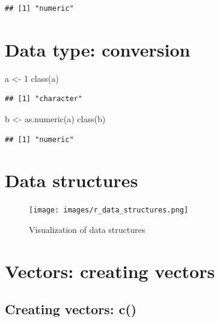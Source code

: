 \documentclass[
  11pt,
]{book}
\newenvironment{Shaded}{\begin{snugshade}}{\end{snugshade}}
\newcommand{\FunctionTok}[1]{\textcolor[rgb]{0.00,0.00,0.00}{#1}}
\newcommand{\NormalTok}[1]{#1}
\newcommand{\OtherTok}[1]{\textcolor[rgb]{0.56,0.35,0.01}{#1}}
\newcommand{\StringTok}[1]{\textcolor[rgb]{0.31,0.60,0.02}{#1}}
\begin{document}
\begin{verbatim}
## [1] "numeric"
\end{verbatim}

\hypertarget{data-type-conversion}{%
\section{Data type: conversion}\label{data-type-conversion}}

\begin{Shaded}
\begin{Highlighting}[]
\NormalTok{a }\OtherTok{\textless{}{-}} \StringTok{\textquotesingle{}1\textquotesingle{}}
\FunctionTok{class}\NormalTok{(a)}
\end{Highlighting}
\end{Shaded}

\begin{verbatim}
## [1] "character"
\end{verbatim}

\begin{Shaded}
\begin{Highlighting}[]
\NormalTok{b }\OtherTok{\textless{}{-}} \FunctionTok{as.numeric}\NormalTok{(a)}
\FunctionTok{class}\NormalTok{(b)}
\end{Highlighting}
\end{Shaded}

\begin{verbatim}
## [1] "numeric"
\end{verbatim}

\hypertarget{data-structures}{%
\section{Data structures}\label{data-structures}}

\begin{figure}
\centering
\texttt{[image: images/r\_data\_structures.png]}
\caption{Visualization of data structures}
\end{figure}

\hypertarget{vectors-creating-vectors}{%
\section{Vectors: creating vectors}\label{vectors-creating-vectors}}

\hypertarget{creating-vectors-c}{%
\subsection{Creating vectors: c()}\label{creating-vectors-c}}
\end{document}
